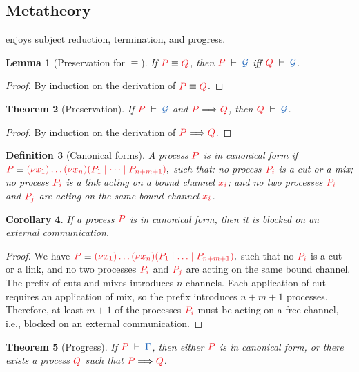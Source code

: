 \documentclass[submission,copyright,creativecommons]{eptcs}
\newtheorem{lemma}{Lemma}[section]
\newtheorem{theorem}[lemma]{Theorem}
\newtheorem{corollary}[lemma]{Corollary}
\newtheorem{definition}[lemma]{Definition}
\begin{document}
\subsection{Metatheory}
\hcp enjoys subject reduction, termination, and progress.
\begin{lemma}[Preservation for $\equiv$]\label{lem:hcp-preservation-equiv}
  If $\tm{P}\equiv\tm{Q}$, then $\seq[P]{\mathcal{G}}$ iff $\seq[Q]{\mathcal{G}}$.
\end{lemma} 
\begin{proof}
  By induction on the derivation of $\tm{P}\equiv\tm{Q}$.
\end{proof}
\begin{theorem}[Preservation]\label{thm:hcp-preservation}
  If $\seq[P]{\mathcal{G}}$ and $\reducesto{P}{Q}$, then $\seq[Q]{\mathcal{G}}$.
\end{theorem} 
\begin{proof}
  By induction on the derivation of $\reducesto{P}{Q}$.
\end{proof}
\begin{definition}[Canonical forms]
  A process $\tm{P}$ is in canonical form if
  \(
  \tm{P} \equiv \tm{\piNew{x_1}{\dots\piNew{x_n}{(P_1 \mid \dots \mid P_{n+m+1})}}},
  \)
  such that: no process $\tm{P_i}$ is a cut or a mix; no process $\tm{P_i}$ is a link acting on a bound channel $\tm{x_i}$; and no two processes $\tm{P_i}$ and $\tm{P_j}$ are acting on the same bound channel $\tm{x_i}$.
\end{definition}
\begin{corollary}
  If a process $\tm{P}$ is in canonical form, then it is blocked on an external communication.
\end{corollary}
\begin{proof}
  We have
  \(
  \tm{P} \equiv \tm{\piNew{x_1}{\dots\piNew{x_n}{(P_1 \ppar \dots \ppar P_{n+m+1})}}},
  \)
  such that no $\tm{P_i}$ is a cut or a link, and no two processes $\tm{P_i}$ and $\tm{P_j}$ are acting on the same bound channel. The prefix of cuts and mixes introduces $n$ channels. Each application of cut requires an application of mix, so the prefix introduces $n+m+1$ processes. Therefore, at least $m+1$ of the processes $\tm{P_i}$ must be acting on a free channel, i.e., blocked on an external communication.
\end{proof}
\begin{theorem}[Progress]\label{thm:hcp-progress}
  If $\seq[P]{\Gamma}$, then either $\tm{P}$ is in canonical form, or there exists a process $\tm{Q}$ such that $\tm{P}\Longrightarrow\tm{Q}$.
\end{theorem} 
\end{document}
